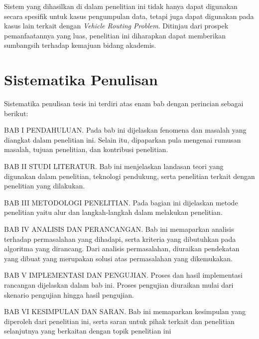 Sistem yang dihasilkan di dalam penelitian ini tidak hanya dapat digunakan secara spesifik untuk kasus pengumpulan data, tetapi juga dapat digunakan pada kasus lain terkait dengan \textit{Vehicle Routing Problem}. Ditinjau dari prospek pemanfaatannya yang luas, penelitian ini diharapkan dapat memberikan sumbangsih terhadap kemajuan bidang akademis. 

\section{Sistematika Penulisan}
Sistematika penulisan tesis ini terdiri atas enam bab dengan perincian sebagai berikut:


BAB I PENDAHULUAN. Pada bab ini dijelaskan fenomena dan masalah yang diangkat dalam penelitian ini. Selain itu, dipaparkan pula mengenai rumusan masalah, tujuan penelitian, dan kontribusi penelitian.


BAB II STUDI LITERATUR. Bab ini menjelaskan landasan teori yang digunakan dalam penelitian, teknologi pendukung, serta penelitian terkait dengan penelitian yang dilakukan.


BAB III METODOLOGI PENELITIAN. Pada bagian ini dijelaskan metode penelitian yaitu alur dan langkah-langkah dalam melakukan penelitian.


BAB IV ANALISIS DAN PERANCANGAN. Bab ini memaparkan analisis terhadap permasalahan yang dihadapi, serta kriteria yang dibutuhkan pada algoritma yang dirancang. Dari analisis permasalahan, diuraikan pendekatan yang dibuat yang merupakan solusi atas permasalahan yang dikemukakan.


BAB V IMPLEMENTASI DAN PENGUJIAN. Proses dan hasil implementasi rancangan dijelaskan dalam bab ini. Proses pengujian diuraikan mulai dari skenario pengujian hingga hasil pengujian.


BAB VI KESIMPULAN DAN SARAN. Bab ini memaparkan kesimpulan yang diperoleh dari penelitian ini, serta saran untuk pihak terkait dan penelitian selanjutnya yang berkaitan dengan topik penelitian ini
